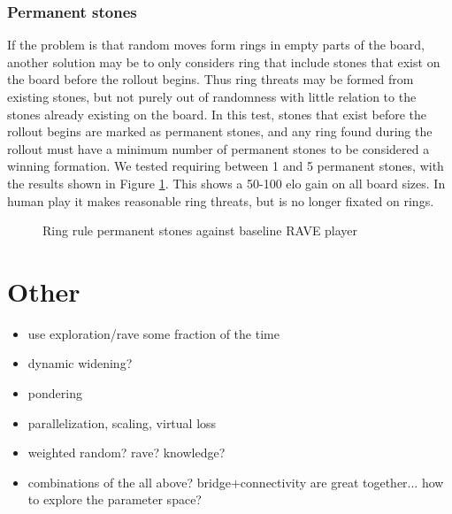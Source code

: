 \subsubsection{Permanent stones}

If the problem is that random moves form rings in empty parts of the board, another solution may be to only considers ring that include stones that exist on the board before the rollout begins. Thus ring threats may be formed from existing stones, but not purely out of randomness with little relation to the stones already existing on the board. In this test, stones that exist before the rollout begins are marked as permanent stones, and any ring found during the rollout must have a minimum number of permanent stones to be considered a winning formation. We tested requiring between 1 and 5 permanent stones, with the results shown in Figure \ref{fig:ringperm}. This shows a 50-100 elo gain on all board sizes. In human play it makes reasonable ring threats, but is no longer fixated on rings.

\begin{figure}
	\centering
{}
	\caption{Ring rule permanent stones against baseline RAVE player}
	\label{fig:ringperm}
\end{figure}


\section{Other}

\begin{itemize}
\item use exploration/rave some fraction of the time
\item dynamic widening?
\item pondering
\item parallelization, scaling, virtual loss
\item weighted random? rave? knowledge?
\item combinations of the all above? bridge+connectivity are great together... how to explore the parameter space?
\end{itemize}

